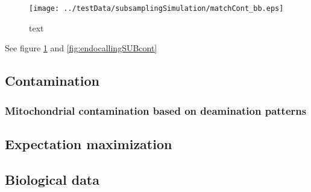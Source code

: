 \documentclass[a4paper,12pt]{article}
\begin{document}
\begin{itemize}
\begin{itemize}
\begin{figure}[H]
\centering
\texttt{[image: ../testData/subsamplingSimulation/matchCont\_bb.eps]} 
\caption{text}
\label{fig:endocallingSUBendo}
\end{figure}

See figure \ref{fig:endocallingSUBendo} and \ref{fig:endocallingSUBcont}




%
\clearpage


\subsection{Contamination}
\label{sec:res:cont}

\subsubsection{Mitochondrial contamination based on deamination patterns}
\label{sec:res:contdeam}








\subsection{Expectation maximization}


\subsection{Biological data}



\end{itemize}
\end{itemize}
\end{document}
